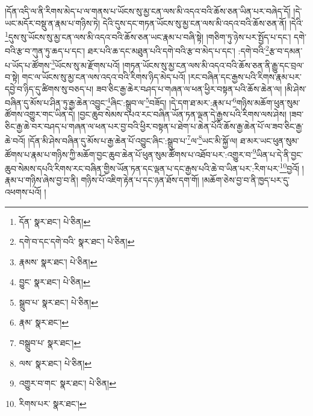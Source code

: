 །དོན་འདི་ལ་ནི་རིགས་མེད་པ་ལ་གནས་པ་ཡོངས་སུ་མྱ་ངན་ལས་མི་འདའ་བའི་ཆོས་ཅན་ཡིན་པར་བཞེད་དོ། །དེ་ཡང་མདོར་བསྡུ་ན་རྣམ་པ་གཉིས་ཏེ། དེའི་དུས་དང་གཏན་ཡོངས་སུ་མྱ་ངན་ལས་མི་འདའ་བའི་ཆོས་ཅན་ནོ། །དེའི་\footnote{དོན་  སྣར་ཐང་།  པེ་ཅིན། }དུས་སུ་ཡོངས་སུ་མྱ་ངན་ལས་མི་འདའ་བའི་ཆོས་ཅན་ཡང་རྣམ་པ་བཞི་སྟེ། །གཅིག་ཏུ་ཉེས་པར་སྤྱོད་པ་དང་། དགེ་བའི་རྩ་བ་ཀུན་ཏུ་ཆད་པ་དང་། ཐར་པའི་ཆ་དང་མཐུན་པའི་དགེ་བའི་རྩ་བ་མེད་པ་དང་། :དགེ་བའི་\footnote{དགེ་བ་དང་དགེ་བའི་  སྣར་ཐང་།  པེ་ཅིན། }རྩ་བ་དམན་པ་ཡོད་པ་ཚོགས་\footnote{རྣམས་  སྣར་ཐང་།  པེ་ཅིན། }ཡོངས་སུ་མ་རྫོགས་པའོ། །གཏན་ཡོངས་སུ་མྱ་ངན་ལས་མི་འདའ་བའི་ཆོས་ཅན་ནི་རྒྱུ་དང་བྲལ་བ་སྟེ། གང་ལ་ཡོངས་སུ་མྱ་ངན་ལས་འདའ་བའི་རིགས་ཉིད་མེད་པའོ། །རང་བཞིན་དང་རྒྱས་པའི་རིགས་རྣམ་པར་དབྱེ་བ་ཉིད་དུ་ཚིགས་སུ་བཅད་པ། ཟབ་ཅིང་རྒྱ་ཆེར་བཤད་པ་གཞན་ལ་ཕན་ཕྱིར་བསྟན་པའི་ཆོས་ཆེན་ལ། །མི་ཤེས་བཞིན་དུ་མོས་པ་ཤིན་ཏུ་རྒྱ་ཆེན་འབྱུང་\footnote{བྱུང་  སྣར་ཐང་།  པེ་ཅིན། }ཞིང་:སྒྲུབ་ལ་\footnote{སྒྲུབ་པ་  སྣར་ཐང་།  པེ་ཅིན། }བཟོད། །དེ་དག་ཐ་མར་:རྣམ་པ་\footnote{རྣམ་  སྣར་ཐང་། }གཉིས་མཆོག་ཕུན་སུམ་ཚོགས་འགྱུར་གང་ཡིན་དེ། །བྱང་ཆུབ་སེམས་དཔའ་རང་བཞིན་ཡོན་ཏན་ལྡན་དེ་རྒྱས་པའི་རིགས་ལས་ཤེས། །ཟབ་ཅིང་རྒྱ་ཆེ་བར་བཤད་པ་གཞན་ལ་ཕན་པར་བྱ་བའི་ཕྱིར་བསྟན་པ་ཐེག་པ་ཆེན་པོའི་ཆོས་རྒྱ་ཆེན་པོ་ལ་ཟབ་ཅིང་རྒྱ་ཆེ་བའོ། །དོན་མི་ཤེས་བཞིན་དུ་མོས་པ་རྒྱ་ཆེན་པོ་འབྱུང་ཞིང་:སྒྲུབ་པ་\footnote{བསྒྲུབ་པ་  སྣར་ཐང་། }ལ་\footnote{ལས་  སྣར་ཐང་།  པེ་ཅིན། }ཡང་མི་སྐྱོ་ལ། ཐ་མར་ཡང་ཕུན་སུམ་ཚོགས་པ་རྣམ་པ་གཉིས་ཀྱི་མཆོག་བྱང་ཆུབ་ཆེན་པོ་ཕུན་སུམ་ཚོགས་པ་འཐོབ་པར་:འགྱུར་བ་\footnote{འགྱུར་བ་གང་  སྣར་ཐང་།  པེ་ཅིན། }ཡིན་པ་དེ་ནི་བྱང་ཆུབ་སེམས་དཔའི་རིགས་རང་བཞིན་གྱིས་ཡོན་ཏན་དང་ལྡན་པ་དང་རྒྱས་པའི་ཆེ་བ་ཡིན་པར་:རིག་པར་\footnote{རིགས་པར་  སྣར་ཐང་། }བྱའོ། །རྣམ་པ་གཉིས་ཞེས་བྱ་བ་ནི། གཉིས་པོ་འཇིག་རྟེན་པ་དང་ཉན་ཐོས་དག་གོ། །མཆོག་ཅེས་བྱ་བ་ནི་ཁྱད་པར་དུ་འཕགས་པའོ། །
